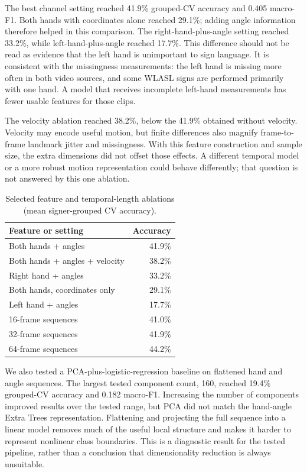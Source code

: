 \documentclass[12pt,a4paper,oneside]{report}
\begin{document}
The best channel setting reached 41.9\% grouped-CV accuracy and 0.405 macro-F1. Both hands with coordinates alone reached 29.1\%; adding angle information therefore helped in this comparison. The right-hand-plus-angle setting reached 33.2\%, while left-hand-plus-angle reached 17.7\%. This difference should not be read as evidence that the left hand is unimportant to sign language. It is consistent with the missingness measurements: the left hand is missing more often in both video sources, and some WLASL signs are performed primarily with one hand. A model that receives incomplete left-hand measurements has fewer usable features for those clips.

The velocity ablation reached 38.2\%, below the 41.9\% obtained without velocity. Velocity may encode useful motion, but finite differences also magnify frame-to-frame landmark jitter and missingness. With this feature construction and sample size, the extra dimensions did not offset those effects. A different temporal model or a more robust motion representation could behave differently; that question is not answered by this one ablation.

\begin{table}[H]
\centering
\label{tab:ablation}
\begin{tabular}{lr}
\toprule
Feature or setting & Accuracy \\
\midrule
Both hands + angles & 41.9\% \\
Both hands + angles + velocity & 38.2\% \\
Right hand + angles & 33.2\% \\
Both hands, coordinates only & 29.1\% \\
Left hand + angles & 17.7\% \\
16-frame sequences & 41.0\% \\
32-frame sequences & 41.9\% \\
64-frame sequences & 44.2\% \\
\bottomrule
\end{tabular}
\caption{Selected feature and temporal-length ablations (mean signer-grouped CV accuracy).}
\end{table}

We also tested a PCA-plus-logistic-regression baseline on flattened hand and angle sequences. The largest tested component count, 160, reached 19.4\% grouped-CV accuracy and 0.182 macro-F1. Increasing the number of components improved results over the tested range, but PCA did not match the hand-angle Extra Trees representation. Flattening and projecting the full sequence into a linear model removes much of the useful local structure and makes it harder to represent nonlinear class boundaries. This is a diagnostic result for the tested pipeline, rather than a conclusion that dimensionality reduction is always unsuitable.
\end{document}
